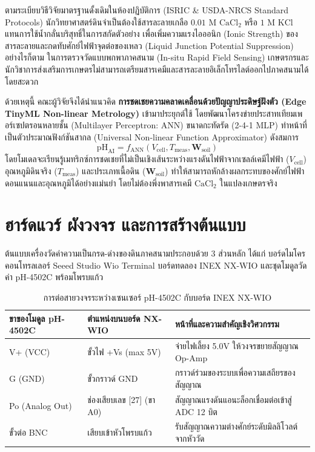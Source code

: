 \documentclass[12pt,a4paper,oneside]{report}
\begin{document}
ตามระเบียบวิธีวิจัยมาตรฐานดั้งเดิมในห้องปฏิบัติการ (ISRIC \& USDA-NRCS Standard Protocols) นักวิทยาศาสตร์ดินจำเป็นต้องใช้สารละลายเกลือ $0.01\text{ M } \text{CaCl}_2$ หรือ $1\text{ M } \text{KCl}$ แทนการใช้น้ำกลั่นบริสุทธิ์ในการสกัดตัวอย่าง เพื่อเพิ่มความแรงไอออนิก (Ionic Strength) ของสารละลายและกดทับศักย์ไฟฟ้าจุดต่อของเหลว (Liquid Junction Potential Suppression) อย่างไรก็ตาม ในการตรวจวัดแบบพกพาภาคสนาม (In-situ Rapid Field Sensing) เกษตรกรและนักวิชาการส่งเสริมการเกษตรไม่สามารถเตรียมสารเคมีและสารละลายอิเล็กโทรไลต์ออกไปภาคสนามได้โดยสะดวก

ด้วยเหตุนี้ คณะผู้วิจัยจึงได้นำแนวคิด \textbf{การชดเชยความคลาดเคลื่อนด้วยปัญญาประดิษฐ์ฝังตัว (Edge TinyML Non-linear Metrology)} เข้ามาประยุกต์ใช้ โดยพัฒนาโครงข่ายประสาทเทียมเพอร์เซปตรอนหลายชั้น (Multilayer Perceptron: ANN) ขนาดกะทัดรัด (2-4-1 MLP) ทำหน้าที่เป็นตัวประมาณฟังก์ชันสากล (Universal Non-linear Function Approximator) ดังสมการ
\begin{equation}
\text{pH}_{\text{AI}} = f_{\text{ANN}}\left( V_{\text{cell}}, T_{\text{meas}}, \mathbf{W}_{\text{soil}} \right)
\end{equation}
โดยโมเดลจะเรียนรู้เมทริกซ์การชดเชยที่ไม่เป็นเชิงเส้นระหว่างแรงดันไฟฟ้าจากเซลล์เคมีไฟฟ้า ($V_{\text{cell}}$) อุณหภูมิดินจริง ($T_{\text{meas}}$) และประเภทเนื้อดิน ($\mathbf{W}_{\text{soil}}$) ทำให้สามารถหักล้างผลกระทบของศักย์ไฟฟ้าดอนแนนและอุณหภูมิได้อย่างแม่นยำ โดยไม่ต้องพึ่งพาสารเคมี $\text{CaCl}_2$ ในแปลงเกษตรจริง

\chapter{ฮาร์ดแวร์ ผังวงจร และการสร้างต้นแบบ}

ต้นแบบเครื่องวัดค่าความเป็นกรด-ด่างของดินภาคสนามประกอบด้วย 3 ส่วนหลัก ได้แก่ บอร์ดไมโครคอนโทรลเลอร์ Seeed Studio Wio Terminal บอร์ดทดลอง INEX NX-WIO และชุดโมดูลวัดค่า pH-4502C พร้อมโพรบแก้ว

\begin{table}[htbp]
\centering
\caption{การต่อสายวงจรระหว่างเซนเซอร์ pH-4502C กับบอร์ด INEX NX-WIO}
\label{tab:wiring}
\begin{tabularx}{\textwidth}{p{3.5cm}p{4.0cm}Y}
\toprule
\textbf{ขาของโมดูล pH-4502C} & \textbf{ตำแหน่งบนบอร์ด NX-WIO} & \textbf{หน้าที่และความสำคัญเชิงวิศวกรรม} \\
\midrule
V+ (VCC) & ขั้วไฟ +Vs (max 5V) & จ่ายไฟเลี้ยง 5.0V ให้วงจรขยายสัญญาณ Op-Amp \\
G (GND)  & ขั้วกราวด์ GND       & กราวด์ร่วมของระบบเพื่อความเสถียรของสัญญาณ \\
Po (Analog Out) & ช่องเสียบเลข [27] (ขา A0) & สัญญาณแรงดันแอนะล็อกเชื่อมต่อเข้าสู่ ADC 12 บิต \\
ขั้วต่อ BNC & เสียบเข้าหัวโพรบแก้ว & รับสัญญาณความต่างศักย์ระดับมิลลิโวลต์จากหัววัด \\
\bottomrule
\end{tabularx}
\end{table}
\end{document}
